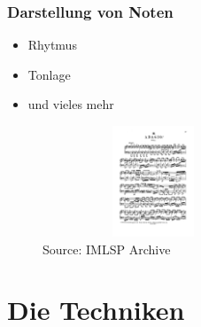 \documentclass{beamer}
\begin{document}
	\begin{frame}
		\frametitle{Darstellung von Noten}
		\begin{itemize}
			\item Rhytmus
			\item Tonlage 
			\item und vieles mehr
			\end{itemize}
	
		
		\begin{figure}[h!]
			\includegraphics[width=250px,height=125px,keepaspectratio]{bach_adagio}
			\caption{Source: IMLSP Archive}
		\end{figure}


	\end{frame}

	
	\section{Die Techniken}
\end{document}
